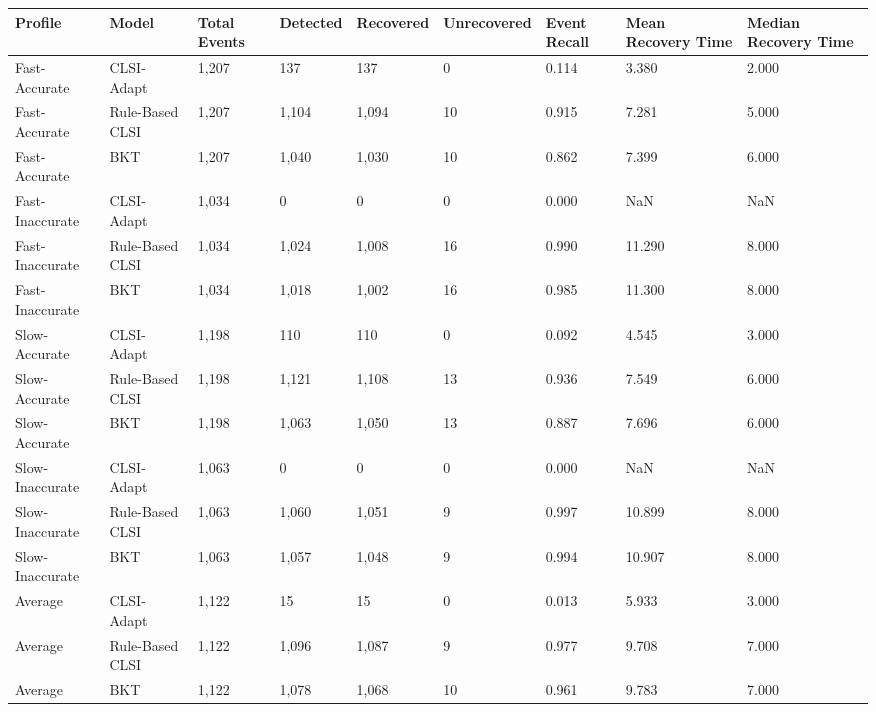 \begin{table}[ht]
\centering
\begin{tabular}{lllllllll}
\toprule
Profile & Model & Total Events & Detected & Recovered & Unrecovered & Event Recall & Mean Recovery Time & Median Recovery Time \\
\midrule
Fast-Accurate & CLSI-Adapt & 1,207 & 137 & 137 & 0 & 0.114 & 3.380 & 2.000 \\
Fast-Accurate & Rule-Based CLSI & 1,207 & 1,104 & 1,094 & 10 & 0.915 & 7.281 & 5.000 \\
Fast-Accurate & BKT & 1,207 & 1,040 & 1,030 & 10 & 0.862 & 7.399 & 6.000 \\
Fast-Inaccurate & CLSI-Adapt & 1,034 & 0 & 0 & 0 & 0.000 & NaN & NaN \\
Fast-Inaccurate & Rule-Based CLSI & 1,034 & 1,024 & 1,008 & 16 & 0.990 & 11.290 & 8.000 \\
Fast-Inaccurate & BKT & 1,034 & 1,018 & 1,002 & 16 & 0.985 & 11.300 & 8.000 \\
Slow-Accurate & CLSI-Adapt & 1,198 & 110 & 110 & 0 & 0.092 & 4.545 & 3.000 \\
Slow-Accurate & Rule-Based CLSI & 1,198 & 1,121 & 1,108 & 13 & 0.936 & 7.549 & 6.000 \\
Slow-Accurate & BKT & 1,198 & 1,063 & 1,050 & 13 & 0.887 & 7.696 & 6.000 \\
Slow-Inaccurate & CLSI-Adapt & 1,063 & 0 & 0 & 0 & 0.000 & NaN & NaN \\
Slow-Inaccurate & Rule-Based CLSI & 1,063 & 1,060 & 1,051 & 9 & 0.997 & 10.899 & 8.000 \\
Slow-Inaccurate & BKT & 1,063 & 1,057 & 1,048 & 9 & 0.994 & 10.907 & 8.000 \\
Average & CLSI-Adapt & 1,122 & 15 & 15 & 0 & 0.013 & 5.933 & 3.000 \\
Average & Rule-Based CLSI & 1,122 & 1,096 & 1,087 & 9 & 0.977 & 9.708 & 7.000 \\
Average & BKT & 1,122 & 1,078 & 1,068 & 10 & 0.961 & 9.783 & 7.000 \\
\bottomrule
\end{tabular}
\end{table}